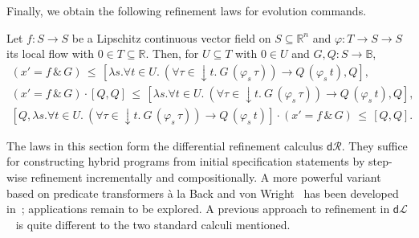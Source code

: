 \documentclass[envcountsame,envcountsect]{llncs}
\newcommand{\dL}{\mathsf{d}\mathcal{L}}
\newcommand{\dR}{\mathsf{d}\mathcal{R}}
\newcommand{\flow}{\varphi}
\newcommand{\reals}{\mathbb{R}}
\newcommand{\bools}{\mathbb{B}}
\begin{document}
Finally, we obtain the following refinement laws for evolution
commands.
\begin{lemma}\label{P:r-evl-lemma}
  Let $f:S\to S$ be a Lipschitz continuous vector field on
  $S\subseteq \reals^n$ and $\flow:T\to S\to S$ its local flow with
  $0\in T\subseteq \reals$. Then, for $U\subseteq T$ with $0\in U$ and
  $G,Q:S\to\bools$,
\begin{gather*}
(x' = f\, \&\, G)\, \le\, [\lambda s.\forall t\in U.\ (\forall
\tau\in {\downarrow}t.\ G\, (\flow_s\, \tau))\to Q\, (\flow_s\, t),Q],\label{eq:r-evl}\tag{r-evl}\\
(x' = f\, \&\, G) \cdot \left[Q,Q\right]\, \le\, [\lambda s. \forall t\in U.\ (\forall
\tau\in {\downarrow}t.\ G\, (\flow_s\, \tau))\to Q\, (\flow_s\, t),Q],\label{eq:r-evll}\tag{r-evll}\\
\left[Q,\lambda s. \forall t\in U.\ (\forall
\tau\in {\downarrow}t.\ G\, (\flow_s\, \tau))\to Q\, (\flow_s\,
t)\right]\cdot (x' = f\, \&\, G) \, \le \, [Q,Q].\label{eq:r-evlr}\tag{r-evlr}
\end{gather*}
\end{lemma}

The laws in this section form the differential refinement calculus
$\dR$.  They suffice for constructing hybrid programs from initial
specification statements by step-wise refinement incrementally and
compositionally. A more powerful variant
based on predicate transformers \`a la Back and von
Wright~\cite{BackW98} has been developed in~\cite{MuniveS19};
applications remain to be explored.  A previous approach to refinement
in $\dL$~\cite{LoosP16} is quite different to the two standard calculi mentioned.
\end{document}
